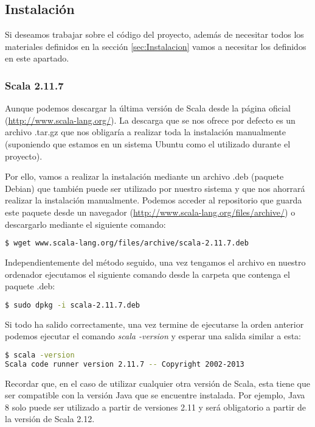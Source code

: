 \subsection{Instalación}

Si deseamos trabajar sobre el código del proyecto, además de necesitar todos los materiales definidos en la sección \ref{sec:Instalacion} vamos a necesitar los definidos en este apartado.

\subsubsection{Scala 2.11.7}
Aunque podemos descargar la última versión de Scala desde la página oficial (\url{http://www.scala-lang.org/}). La descarga que se nos ofrece por defecto es un archivo .tar.gz que nos obligaría a realizar toda la instalación manualmente (suponiendo que estamos en un sistema Ubuntu como el utilizado durante el proyecto).

Por ello, vamos a realizar la instalación mediante un archivo .deb (paquete Debian) que también puede ser utilizado por nuestro sistema y que nos ahorrará realizar la instalación manualmente. Podemos acceder al repositorio que guarda este paquete desde un navegador (\url{http://www.scala-lang.org/files/archive/}) o descargarlo mediante el siguiente comando:

\begin{lstlisting}[language=bash]
$ wget www.scala-lang.org/files/archive/scala-2.11.7.deb
\end{lstlisting}

Independientemente del método seguido, una vez tengamos el archivo en nuestro ordenador ejecutamos el siguiente comando desde la carpeta que contenga el paquete .deb:

\begin{lstlisting}[language=bash]
$ sudo dpkg -i scala-2.11.7.deb
\end{lstlisting}

Si todo ha salido correctamente, una vez termine de ejecutarse la orden anterior podemos ejecutar el comando \textit{scala -version} y esperar una salida similar a esta:

\begin{lstlisting}[language=bash]
$ scala -version
Scala code runner version 2.11.7 -- Copyright 2002-2013
\end{lstlisting}

Recordar que, en el caso de utilizar cualquier otra versión de Scala, esta tiene que ser compatible con la versión Java que se encuentre instalada. Por ejemplo, Java 8 solo puede ser utilizado a partir de versiones 2.11 y será obligatorio a partir de la versión de Scala 2.12. \cite{Scala2.12Roadmap}

